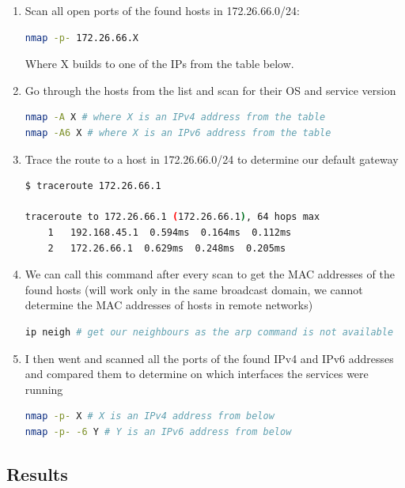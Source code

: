 \begin{enumerate}
    \item Scan all open ports of the found hosts in 172.26.66.0/24:
    \begin{lstlisting}[language=bash,numbers=none]
nmap -p- 172.26.66.X
    \end{lstlisting}
    Where X builds to one of the IPs from the table below.

    \item Go through the hosts from the list and scan for their OS and service version
    \begin{lstlisting}[language=bash,numbers=none]
nmap -A X # where X is an IPv4 address from the table
nmap -A6 X # where X is an IPv6 address from the table
    \end{lstlisting}

    \item Trace the route to a host in 172.26.66.0/24 to determine our default gateway
    \begin{lstlisting}[language=bash,numbers=none]
$ traceroute 172.26.66.1

traceroute to 172.26.66.1 (172.26.66.1), 64 hops max
    1   192.168.45.1  0.594ms  0.164ms  0.112ms
    2   172.26.66.1  0.629ms  0.248ms  0.205ms
    \end{lstlisting}

    \item We can call this command after every scan to get the MAC addresses of the found hosts
    (will work only in the same broadcast domain, we cannot determine the MAC addresses of hosts in remote networks)
    \begin{lstlisting}[language=bash,numbers=none]
ip neigh # get our neighbours as the arp command is not available
    \end{lstlisting}

    \item I then went and scanned all the ports of the found IPv4 and IPv6 addresses and compared them
    to determine on which interfaces the services were running
    \begin{lstlisting}[language=bash,numbers=none]
nmap -p- X # X is an IPv4 address from below
nmap -p- -6 Y # Y is an IPv6 address from below
    \end{lstlisting}

\end{enumerate}

\subsection{Results}

